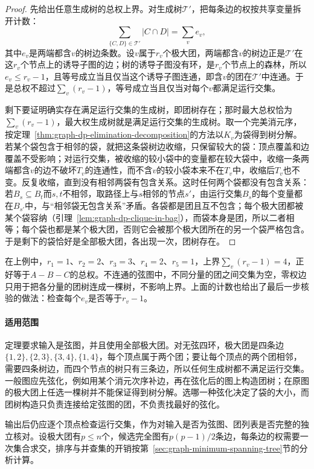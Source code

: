 \begin{proof}
先给出任意生成树的总权上界。对生成树$\mathcal T'$，把每条边的权按共享变量拆开计数：
\[
\sum_{\{C,D\}\in\mathcal T'}|C\cap D|=\sum_{v}e_v,
\]
其中$e_v$是两端都含$v$的树边条数。设$v$属于$r_v$个极大团，两端都含$v$的树边正是$\mathcal T'$在这$r_v$个节点上的诱导子图的边；树的诱导子图没有环，是$r_v$个节点上的森林，所以$e_v\leq r_v-1$，且等号成立当且仅当这个诱导子图连通，即含$v$的团在$\mathcal T'$中连通。于是总权不超过$\sum_v(r_v-1)$，等号成立当且仅当对每个$v$都满足运行交集。

剩下要证明确实存在满足运行交集的生成树，即团树存在；那时最大总权恰为$\sum_v(r_v-1)$，最大权生成树就是满足运行交集的生成树。取一个完美消元序，按定理~\ref{thm:graph-dp-elimination-decomposition}的方法以$K_v$为袋得到树分解。若某个袋包含于相邻的袋，就把这条袋树边收缩，只保留较大的袋：顶点覆盖和边覆盖不受影响；对运行交集，被收缩的较小袋中的变量都在较大袋中，收缩一条两端都含$v$的边不破坏$T_v$的连通性，而不含$v$的较小袋本来不在$T_v$中，收缩后$T_v$也不变。反复收缩，直到没有相邻两袋有包含关系。这时任何两个袋都没有包含关系：若$B_s\subseteq B_t$而$s,t$不相邻，取路径上与$s$相邻的节点$s'$，由运行交集$B_s$的每个变量都在$B_{s'}$中，与“相邻袋无包含关系”矛盾。各袋都是团且互不包含；每个极大团都被某个袋容纳（引理~\ref{lem:graph-dp-clique-in-bag}），而袋本身是团，所以二者相等；每个袋也都是某个极大团，否则它会被那个极大团所在的另一个袋严格包含。于是剩下的袋恰好是全部极大团，各出现一次，团树存在。
\end{proof}

在上例中，$r_1=1$、$r_2=2$、$r_3=3$、$r_4=2$、$r_5=1$，上界$\sum_v(r_v-1)=4$，正好等于$A-B-C$的总权。不连通的弦图中，不同分量的团之间交集为空，零权边只用于把各分量的团树连成一棵树，不影响上界。上面的计数也给出了最后一步核验的做法：检查每个$e_v$是否等于$r_v-1$。

\paragraph{适用范围}
定理要求输入是弦图，并且使用全部极大团。对无弦四环，极大团是四条边$\{1,2\},\allowbreak\{2,3\},\allowbreak\{3,4\},\allowbreak\{1,4\}$，每个顶点属于两个团；要让每个顶点的两个团相邻，需要四条树边，而四个节点的树只有三条边，所以任何生成树都不满足运行交集。一般图应先弦化，例如用某个消元次序补边，再在弦化后的图上构造团树；在原图的极大团上任选一棵树并不能保证得到树分解。选哪一种弦化决定了袋的大小，而团树构造只负责连接给定弦图的团，不负责找最好的弦化。

输出后仍应逐个顶点检查运行交集，作为对输入是否为弦图、团列表是否完整的独立核对。设极大团有$p\leq n$个，候选完全图有$p(p-1)/2$条边，每条边的权需要一次集合求交，排序与并查集的开销按第~\ref{sec:graph-minimum-spanning-tree}节的分析计算。
